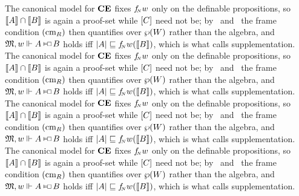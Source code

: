 \documentclass[letterpaper,12pt]{article}
\begin{document}
The canonical model for $\textup{\textbf{CE}}$ fixes ${f_{{\mkern-3.6mu\scriptscriptstyle N}}}{w}$ only on the definable propositions, so $\llbracket A\rrbracket\cap\llbracket B\rrbracket$ is again a proof-set while $[C]$ need not be; by \CMl\ and \CMr\ the frame condition $(\textnormal{cm}_{R})$ then quantifies over $\wp(W)$ rather than the algebra, and $\M,w\trues A\cnecs B$ holds iff $|A|\sqsubseteq{f_{{\mkern-3.6mu\scriptscriptstyle N}}}{w}(\llbracket B\rrbracket)$, which is what \cite{chellas1980} calls supplementation. The canonical model for $\textup{\textbf{CE}}$ fixes ${f_{{\mkern-3.6mu\scriptscriptstyle N}}}{w}$ only on the definable propositions, so $\llbracket A\rrbracket\cap\llbracket B\rrbracket$ is again a proof-set while $[C]$ need not be; by \CMl\ and \CMr\ the frame condition $(\textnormal{cm}_{R})$ then quantifies over $\wp(W)$ rather than the algebra, and $\M,w\trues A\cnecs B$ holds iff $|A|\sqsubseteq{f_{{\mkern-3.6mu\scriptscriptstyle N}}}{w}(\llbracket B\rrbracket)$, which is what \cite{chellas1980} calls supplementation. The canonical model for $\textup{\textbf{CE}}$ fixes ${f_{{\mkern-3.6mu\scriptscriptstyle N}}}{w}$ only on the definable propositions, so $\llbracket A\rrbracket\cap\llbracket B\rrbracket$ is again a proof-set while $[C]$ need not be; by \CMl\ and \CMr\ the frame condition $(\textnormal{cm}_{R})$ then quantifies over $\wp(W)$ rather than the algebra, and $\M,w\trues A\cnecs B$ holds iff $|A|\sqsubseteq{f_{{\mkern-3.6mu\scriptscriptstyle N}}}{w}(\llbracket B\rrbracket)$, which is what \cite{chellas1980} calls supplementation. The canonical model for $\textup{\textbf{CE}}$ fixes ${f_{{\mkern-3.6mu\scriptscriptstyle N}}}{w}$ only on the definable propositions, so $\llbracket A\rrbracket\cap\llbracket B\rrbracket$ is again a proof-set while $[C]$ need not be; by \CMl\ and \CMr\ the frame condition $(\textnormal{cm}_{R})$ then quantifies over $\wp(W)$ rather than the algebra, and $\M,w\trues A\cnecs B$ holds iff $|A|\sqsubseteq{f_{{\mkern-3.6mu\scriptscriptstyle N}}}{w}(\llbracket B\rrbracket)$, which is what \cite{chellas1980} calls supplementation.
\end{document}
